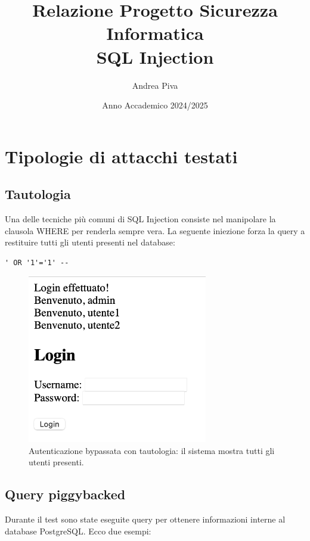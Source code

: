 \documentclass[a4paper,12pt]{article}
\title{Relazione Progetto Sicurezza Informatica\\\large SQL Injection}
\author{Andrea Piva}
\date{Anno Accademico 2024/2025}
\begin{document}
\maketitle

\section{Tipologie di attacchi testati}

\subsection*{Tautologia}

Una delle tecniche più comuni di SQL Injection consiste nel manipolare la clausola WHERE per renderla sempre vera.  
La seguente iniezione forza la query a restituire tutti gli utenti presenti nel database:

\begin{lstlisting}
' OR '1'='1' -- 
\end{lstlisting}

\begin{figure}[h!]
  \centering
  \includegraphics[width=0.7\textwidth]{tautologia_output.png}
  \caption{Autenticazione bypassata con tautologia: il sistema mostra tutti gli utenti presenti.}
\end{figure}

\subsection*{Query piggybacked}

Durante il test sono state eseguite query per ottenere informazioni interne al database PostgreSQL. Ecco due esempi:
\end{document}
